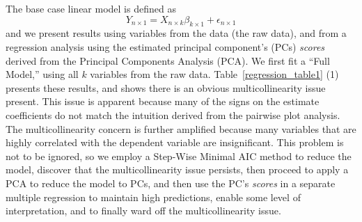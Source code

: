 \documentclass[letterpaper, 12pt]{article}
\begin{document}
	The base case linear model is defined as
	\[ Y_{n\times1} =  X_{n\times k}\beta_{k\times1}+\epsilon_{n\times1}\]
	and we present results using variables from the data (the raw data), and from a regression analysis using the estimated principal component's (PCs) \textit{scores} derived from the Principal Components Analysis (PCA).  We first fit a ``Full Model,'' using all $k$ variables from the raw data.  Table~\ref{regression_table1} (1) presents these results, and shows there is an obvious multicollinearity issue present.  This issue is apparent because many of the signs on the estimate coefficients do not match the intuition derived from the pairwise plot analysis.  The multicollinearity concern is further amplified because many variables that are highly correlated with the dependent variable are insignificant.  This problem is not to be ignored, so we employ a Step-Wise Minimal AIC method to reduce the model, discover that the multicollinearity issue persists, then proceed to apply a PCA to reduce the model to PCs, and then use the PC's \textit{scores} in a separate multiple regression to maintain high predictions, enable some level of interpretation, and to finally ward off the multicollinearity issue.
	
\end{document}

